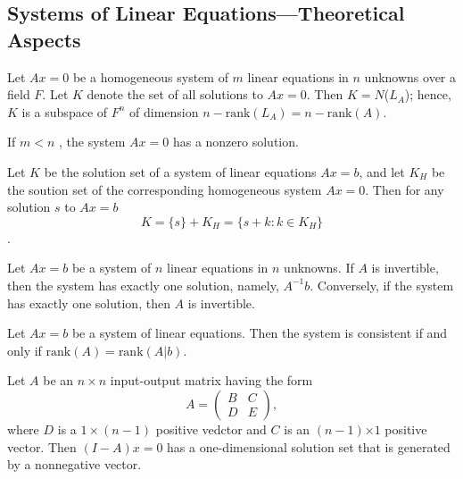 \subsection{Systems of Linear Equations---Theoretical Aspects}
\begin{theorem}
    Let \( Ax = 0 \) be a homogeneous system of \( m \) linear equations in \( n \) unknowns over a field \( F \). Let \( K \) denote the set of all solutions to \( Ax = 0 \). Then \( K =  N\)(\(L_A\));
    hence, \( K \) is a subspace of \( F^n \) of dimension \( n - \text{rank}(L_A) = n - \text{rank}(A) \).
\end{theorem}
\vspace{3cm}
\begin{corollary}
    If \( m < n \) , the system \( Ax = 0 \) has a nonzero solution.
\end{corollary}
\vspace{3cm}
\begin{theorem}
    Let \( K \) be the solution set of a system of linear equations \( Ax = b \), and let \( K_H \) be the soution set of the corresponding homogeneous system \( Ax = 0 \).
    Then for any solution \( s \) to \( Ax = b \) \\
    \[ K = \{s\} + K_H = \{s+k: k \in K_H\} \].
\end{theorem}
\vspace{7cm}
\begin{theorem}
    Let \( Ax = b \) be a system of \( n \) linear equations in \( n \) unknowns. If \( A \) is invertible, then the system has exactly one solution, namely, \( A^{-1}b \).
    Conversely, if the system has exactly one solution, then \( A \) is invertible.
\end{theorem}
\vspace{7cm}
\begin{theorem}
    Let \( Ax = b \) be a system of linear equations. Then the system is consistent if and only if \(\text{rank}(A) = \text{rank}(A|b)\).
\end{theorem}
\vspace{5cm}
\begin{theorem}
    Let \( A \) be an \( n \times n \) input-output matrix having the form
    \[
    A = \begin{pmatrix}
        B & C \\
        D & E
        \end{pmatrix},
    \]
    where \( D \) is a \( 1 \times (n-1)\) positive vedctor and \( C \) is an \((n-1)\)\(\times 1\) positive vector. Then \((I - A)\)\(x = 0\) has a one-dimensional solution set that is generated by a nonnegative vector.
\end{theorem}
\newpage
